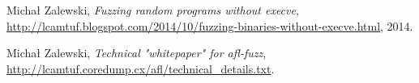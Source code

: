 \begin{thebibliography}{9}

  Michał Zalewski,
  \textit{Fuzzing random programs without execve},
	\url{http://lcamtuf.blogspot.com/2014/10/fuzzing-binaries-without-execve.html},
  2014.

  Michał Zalewski,
  \textit{Technical "whitepaper" for afl-fuzz},
  \url{http://lcamtuf.coredump.cx/afl/technical_details.txt}.

\end{thebibliography}
